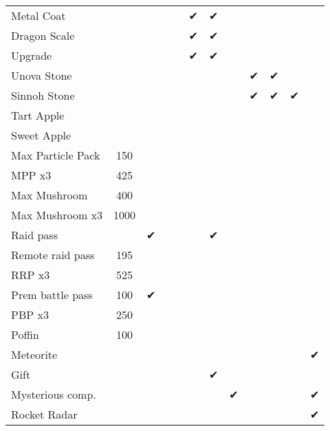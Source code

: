 \begin{table}
\begin{tabular}{p{}ccccccccccc}
Metal Coat        &      &   &           &    &  ✔ &  ✔  &     &     &   &   &   \\
Dragon Scale      &      &   &           &    &  ✔ &  ✔  &     &     &   &   &   \\
Upgrade           &      &   &           &    &  ✔ &  ✔  &     &     &   &   &   \\
Unova Stone       &      &   &           &    &    &     &     &  ✔  & ✔ &   &   \\
Sinnoh Stone      &      &   &           &    &    &     &     &  ✔  & ✔ & ✔ &   \\
Tart Apple        &      &   &           &    &    &     &     &     &   &   &   \\
Sweet Apple       &      &   &           &    &    &     &     &     &   &   &   \\
Max Particle Pack & 150  &   &           &    &    &     &     &     &   &   &   \\
MPP x3            & 425  &   &           &    &    &     &     &     &   &   &   \\
Max Mushroom      & 400  &   &           &    &    &     &     &     &   &   &   \\
Max Mushroom x3   & 1000 &   &           &    &    &     &     &     &   &   &   \\
Raid pass         &      & ✔ &           &    &    &  ✔  &     &     &   &   &   \\ %
Remote raid pass  & 195  &   &           &    &    &     &     &     &   &   &   \\
RRP x3            & 525  &   &           &    &    &     &     &     &   &   &   \\
Prem battle pass  & 100  & ✔ &           &    &    &     &     &     &   &   &   \\
PBP x3            & 250  &   &           &    &    &     &     &     &   &   &   \\
Poffin            & 100  &   &           &    &    &     &     &     &   &   &   \\
Meteorite         &      &   &           &    &    &     &     &     &   &   & ✔ \\ %
Gift              &      &   &           &    &    &  ✔  &     &     &   &   &   \\ %
Mysterious comp.  &      &   &           &    &    &     &  ✔  &     &   &   & ✔ \\
Rocket Radar      &      &   &           &    &    &     &     &     &   &   & ✔ \\ %

\end{tabular}
\end{table}
